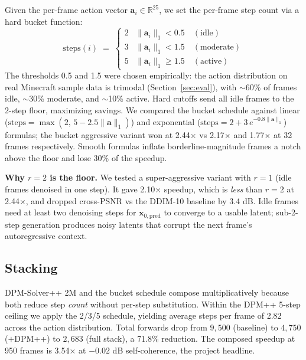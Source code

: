 \documentclass[10pt,letterpaper,twocolumn]{article}
\begin{document}
Given the per-frame action vector $\mathbf{a}_i \in \mathbb{R}^{25}$, we set the per-frame step count via a hard bucket function:
\begin{equation}
\text{steps}(i) \;=\; \begin{cases}
2 & \|\mathbf{a}_i\|_1 < 0.5 \quad (\text{idle}) \\
3 & \|\mathbf{a}_i\|_1 < 1.5 \quad (\text{moderate}) \\
5 & \|\mathbf{a}_i\|_1 \ge 1.5 \quad (\text{active})
\end{cases}
\label{eq:bucket}
\end{equation}
The thresholds 0.5 and 1.5 were chosen empirically: the action distribution on real Minecraft sample data is trimodal (Section~\ref{sec:eval}), with $\sim$60\% of frames idle, $\sim$30\% moderate, and $\sim$10\% active. Hard cutoffs send all idle frames to the 2-step floor, maximizing savings. We compared the bucket schedule against linear ($\text{steps}=\max(2,\,5-2.5\|\mathbf{a}\|_1)$) and exponential ($\text{steps}=2 + 3\,e^{-0.8\|\mathbf{a}\|_1}$) formulas; the bucket aggressive variant won at 2.44$\times$ vs 2.17$\times$ and 1.77$\times$ at 32 frames respectively. Smooth formulas inflate borderline-magnitude frames a notch above the floor and lose 30\% of the speedup.

\textbf{Why $r=2$ is the floor.} We tested a super-aggressive variant with $r=1$ (idle frames denoised in one step). It gave 2.10$\times$ speedup, which is \emph{less} than $r=2$ at 2.44$\times$, and dropped cross-PSNR vs the DDIM-10 baseline by 3.4 dB. Idle frames need at least two denoising steps for $\mathbf{x}_{0,\text{pred}}$ to converge to a usable latent; sub-2-step generation produces noisy latents that corrupt the next frame's autoregressive context.

\subsection{Stacking}

DPM-Solver++ 2M and the bucket schedule compose multiplicatively because both reduce step \emph{count} without per-step substitution. Within the DPM++ 5-step ceiling we apply the 2/3/5 schedule, yielding average steps per frame of 2.82 across the action distribution. Total forwards drop from $9{,}500$ (baseline) to $4{,}750$ ($+$DPM++) to $2{,}683$ (full stack), a 71.8\% reduction. The composed speedup at 950 frames is 3.54$\times$ at $-0.02$ dB self-coherence, the project headline.
\end{document}

